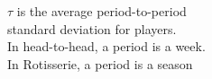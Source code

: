 \documentclass[preview]{standalone}
\begin{document}
\begin{center}
$\tau$ is the average period-to-period \\ standard deviation for players. \\In head-to-head, a period is a week. \\In Rotisserie, a period is a season
\end{center}
\end{document}

